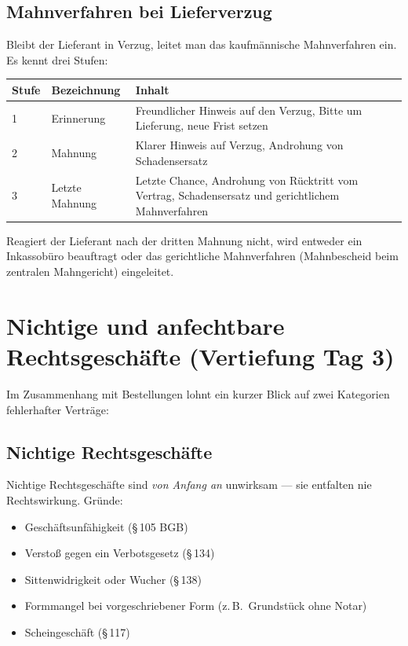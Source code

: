 \documentclass[11pt, a4paper]{article}
\begin{document}
\subsection{Mahnverfahren bei Lieferverzug}

Bleibt der Lieferant in Verzug, leitet man das kaufmännische Mahnverfahren ein.
Es kennt drei Stufen:

\begin{center}
\begin{tabular}{p{2cm} p{4cm} p{8cm}}
\toprule
\textbf{Stufe} & \textbf{Bezeichnung} & \textbf{Inhalt}\\
\midrule
1 & Erinnerung & Freundlicher Hinweis auf den Verzug, Bitte um Lieferung, neue Frist setzen\\
2 & Mahnung & Klarer Hinweis auf Verzug, Androhung von Schadensersatz\\
3 & Letzte Mahnung & Letzte Chance, Androhung von Rücktritt vom Vertrag, Schadensersatz und gerichtlichem Mahnverfahren\\
\bottomrule
\end{tabular}
\end{center}

Reagiert der Lieferant nach der dritten Mahnung nicht, wird entweder ein Inkassobüro
beauftragt oder das gerichtliche Mahnverfahren (Mahnbescheid beim zentralen Mahngericht)
eingeleitet.

\section{Nichtige und anfechtbare Rechtsgeschäfte (Vertiefung Tag 3)}

Im Zusammenhang mit Bestellungen lohnt ein kurzer Blick auf zwei Kategorien fehlerhafter
Verträge:

\subsection{Nichtige Rechtsgeschäfte}

Nichtige Rechtsgeschäfte sind \emph{von Anfang an} unwirksam --- sie entfalten nie
Rechts­wirkung. Gründe:

\begin{itemize}[itemsep=0pt]
  \item Geschäftsunfähigkeit (§\,105 BGB)
  \item Verstoß gegen ein Verbotsgesetz (§\,134)
  \item Sittenwidrigkeit oder Wucher (§\,138)
  \item Formmangel bei vorgeschriebener Form (z.\,B.\ Grundstück ohne Notar)
  \item Scheingeschäft (§\,117)
\end{itemize}
\end{document}
